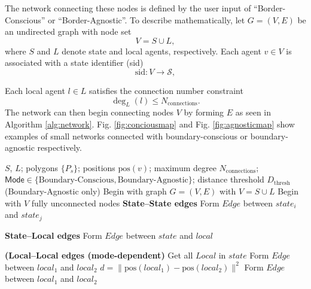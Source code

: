 \documentclass[12pt]{article}
\begin{document}
The network connecting these nodes is defined by the user input of “Border-Conscious” or “Border-Agnostic”.
To describe mathematically,
let \(G=(V,E)\) be an undirected graph with node set
\[
V = S \cup L,
\]
where \(S\) and \(L\) denote state and local agents, respectively.  
Each agent \(v \in V\) is associated with a state identifier (sid)
\[
\mathrm{sid}: V \to \mathcal{S},
\]

Each local agent \(l\in L\) satisfies the connection number constraint
\[
\deg_L(l) \le N_{\mathrm{connections}}.
\]
The network can then begin connecting nodes $V$ by forming $E$ as seen in Algorithm \ref{alg:network}. Fig. \ref{fig:conciousmap} and Fig. \ref{fig:agnosticmap} show examples of small networks connected with boundary-conscious or boundary-agnostic respectively. 

\begin{algorithm}[h!]
\caption{Network Creation (Boundary-Conscious or Boundary-Agnostic)}
\label{alg:network}
\begin{algorithmic}[1]

\Require $S$, $L$; polygons $\{P_s\}$; positions $\mathrm{pos}(v)$; 
maximum degree $N_{\mathrm{connections}}$; $\mathsf{Mode} \in \{\text{Boundary-Conscious},\text{Boundary-Agnostic}\}$; distance threshold $D_{\mathrm{thresh}}$ (Boundary-Agnostic only)
\Ensure Begin with graph $G=(V,E)$ with $V=S\cup L$
\State Begin with  $V$ fully unconnected nodes
\Statex \textbf{State--State edges}
        \State Form $Edge$ between $state_i$ and $state_j$
    \EndIf
\EndFor

\Statex \textbf{State--Local edges}
            \State Form $Edge$ between $state$ and $local$
        \EndIf
    \EndFor
\EndFor

\Statex \textbf{(Local--Local edges (mode-dependent)}
        \State Get all $Local$ in $state$
                \State Form $Edge$ between $local_1$ and $local_2$
            \EndIf
        \EndFor
    \EndFor
{} 
        \State $d = \|\mathrm{pos}(local_1) - \mathrm{pos}(local_2)\|^2$
                \State Form $Edge$ between $local_1$ and $local_2$
            \EndIf
        \EndIf
    \EndFor
\EndIf

\end{algorithmic}
\end{algorithm}
\end{document}
